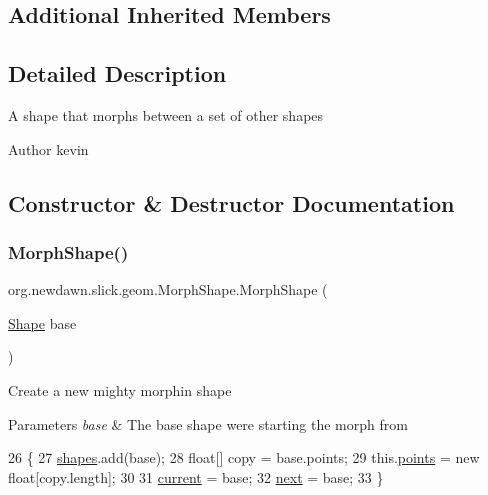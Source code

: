 \subsection*{Additional Inherited Members}


\subsection{Detailed Description}
A shape that morphs between a set of other shapes

\begin{DoxyAuthor}{Author}
kevin 
\end{DoxyAuthor}


\subsection{Constructor \& Destructor Documentation}
\mbox{\label{classorg_1_1newdawn_1_1slick_1_1geom_1_1_morph_shape_a06a4bb0708992bfbcd849ce0a4437f32}} 
\subsubsection{\texorpdfstring{Morph\+Shape()}{MorphShape()}}
{\footnotesize\ttfamily org.\+newdawn.\+slick.\+geom.\+Morph\+Shape.\+Morph\+Shape (\begin{DoxyParamCaption}\item[{\mbox{\hyperlink{classorg_1_1newdawn_1_1slick_1_1geom_1_1_shape}{Shape}}}]{base }\end{DoxyParamCaption})\hspace{0.3cm}{\ttfamily [inline]}}

Create a new mighty morphin shape


\begin{DoxyParams}{Parameters}
{\em base} & The base shape we\textquotesingle{}re starting the morph from \\
\hline
\end{DoxyParams}

\begin{DoxyCode}
26                                   \{
27         \mbox{\hyperlink{classorg_1_1newdawn_1_1slick_1_1geom_1_1_morph_shape_a24eb760097e650b268700165c0cd66f2}{shapes}}.add(base);
28         \textcolor{keywordtype}{float}[] copy = base.points;
29         this.\mbox{\hyperlink{classorg_1_1newdawn_1_1slick_1_1geom_1_1_shape_a8b4d4058734bbb3b96072e470b92aa37}{points}} = \textcolor{keyword}{new} \textcolor{keywordtype}{float}[copy.length];
30         
31         \mbox{\hyperlink{classorg_1_1newdawn_1_1slick_1_1geom_1_1_morph_shape_adc35bd32e88974946c096e273b648575}{current}} = base;
32         \mbox{\hyperlink{classorg_1_1newdawn_1_1slick_1_1geom_1_1_morph_shape_a5ce48bb978769ccae833b7c9f2a7df27}{next}} = base;
33     \}
\end{DoxyCode}


